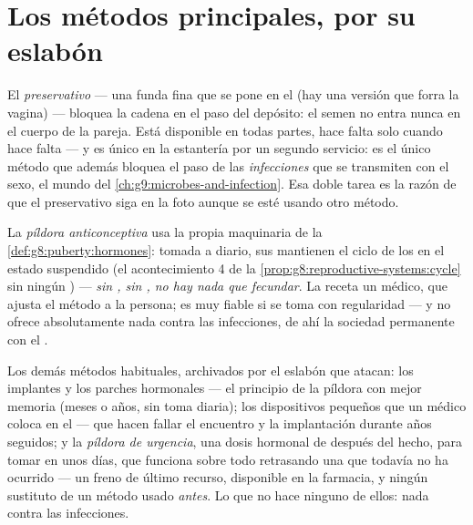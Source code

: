 \section{Los métodos principales, por su eslabón}

\begin{definition}\label{def:g8:contraception:condom}
El \emph{preservativo} --- una funda fina que se
pone en el  (hay una versión  que forra la vagina) ---
bloquea la cadena en el paso del depósito: el semen no entra nunca en
el cuerpo de la pareja. Está disponible en todas partes, hace falta
solo cuando hace falta --- y es único en la estantería por un segundo
servicio: es el único método que además bloquea el paso de las
\emph{infecciones} que se transmiten con el sexo, el mundo del
\cref{ch:g9:microbes-and-infection}. Esa doble tarea es la razón de que
el preservativo siga en la foto aunque se esté usando otro método.
\end{definition}

\begin{definition}\label{def:g8:contraception:pill}
La \emph{píldora anticonceptiva} usa la
propia maquinaria de la \cref{def:g8:puberty:hormones}: tomada a
diario, sus  mantienen el ciclo de los  en el estado
suspendido (el acontecimiento 4 de la
\cref{prop:g8:reproductive-systems:cycle} sin ningún ) ---
\emph{sin , sin  , no hay nada que fecundar}. La
receta un médico, que ajusta el método a la persona; es muy fiable si
se toma con regularidad --- y no ofrece absolutamente nada contra las
infecciones, de ahí la sociedad permanente con el .
\end{definition}

\begin{example}\label{ex:g8:contraception:shelf}
Los demás métodos habituales, archivados por el eslabón que atacan: los
implantes y los parches hormonales --- el principio de la píldora con
mejor memoria (meses o años, sin toma diaria); los dispositivos
pequeños que un médico coloca en el  --- que hacen fallar el
encuentro y la implantación durante años seguidos; y la \emph{píldora
de urgencia}, una dosis hormonal de después del hecho, para tomar en
unos días, que funciona sobre todo retrasando una  que todavía
no ha ocurrido --- un freno de último recurso, disponible en la
farmacia, y ningún sustituto de un método usado \emph{antes}. Lo que no
hace ninguno de ellos: nada contra las infecciones.
\end{example}

